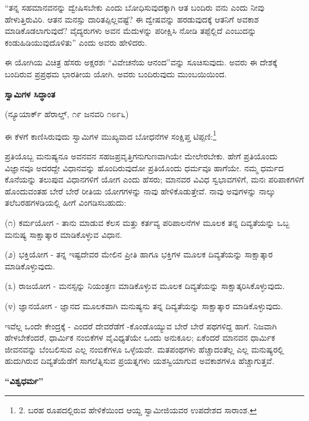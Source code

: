 “ತನ್ನ ಸಹಮಾನವನನ್ನು ದ್ವೇಷಿಸಬೇಕು ಎಂದು ಬೋಧಿಸುವುದಕ್ಕಾಗಿ ಆತ ಬಂದಿರು ವನು ಎಂದು ನೀವು ಹೇಳುತ್ತಿರುವಿರಿ. ಆತನ ಮನಸ್ಸು ದಾರಿತಪ್ಪಿಲ್ಲವಷ್ಟೆ? ಈ ದ್ವೇಷವನ್ನು ಹರಡುವುದಕ್ಕೆ ಆತನಿಗೆ ಅವಕಾಶ ಮಾಡಿಕೊಡಲಾಗುವುದೆ? ವೈದ್ಯರುಗಳು ಅವನ ಮೆದುಳನ್ನು ಪರೀಕ್ಷಿಸಿ ನೋಡಿ ತಪ್ಪೆಲ್ಲಿದೆ ಎಂಬುದನ್ನು ಕಂಡುಹಿಡಿಯುವುದೊಳಿತು” ಎಂದು ಅವರು ಹೇಳಿದರು.

ಈ ಯೋಗಿಯ ವಿಚಿತ್ರ ಹೆಸರು ಅಕ್ಷರಶಃ “ವಿವೇಚನೆಯ ಆನಂದ”ವನ್ನು ಸೂಚಿಸುವುದು. ಅವರು ಈ ದೇಶಕ್ಕೆ ಬಂದಿರುವ ಪ್ರಪ್ರಥಮ ಭಾರತೀಯ ಯೋಗಿ. ಅವರು ಬಂದಿರುವುದು ಮುಂಬಯಿಯಿಂದ.

\begin{center}
\textbf{ಸ್ವಾಮಿಗಳ ಸಿದ್ಧಾಂತ}
\end{center}

\begin{center}
(ನ್ಯೂಯಾರ್ಕ್ ಹೆರಾಲ್ಡ್, ೧೯ ಜನವರಿ ೧೮೯೬)
\end{center}

ಈ ಕೆಳಗೆ ಕಾಣಿಸಿರುವುದು ಸ್ವಾಮಿಗಳ ಮುಖ್ಯವಾದ ಬೋಧನೆಗಳ ಸಂಕ್ಷಿಪ್ತ ಟಿಪ್ಪಣಿ:\footnote{2. ಬರಹ ರೂಪದಲ್ಲಿರುವ ಹೇಳಿಕೆಯಿಂದ ಆಯ್ದ ಸ್ವಾಮೀಜಿಯವರ ಉಪದೇಶದ ಸಾರಾಂಶ.}

ಪ್ರತಿಯೊಬ್ಬ ಮನುಷ್ಯನೂ ಅವನವನ ಸಹಜಪ್ರವೃತ್ತಿಗನುಗುಣವಾಗಿಯೇ ಮೇಲೇರಬೇಕು. ಹೇಗೆ ಪ್ರತಿಯೊಂದು ವಿಜ್ಞಾನವೂ ಅದರದ್ದೇ ವಿಧಾನವನ್ನು ಹೊಂದಿರುವುದೋ ಪ್ರತಿಯೊಂದು ಧರ್ಮವೂ ಹಾಗೆಯೇ. ನಮ್ಮ ಧರ್ಮದ ಕೊನೆಯನ್ನು ತಲುಪುವ ವಿಧಾನಗಳಿಗೆ ಯೋಗ ಎಂದು ಹೆಸರು; ಮಾನವರ ವಿವಿಧ ಸ್ವಭಾವಗಳಿಗೆ, ಮನಃ ಪರಿಪಾಕಗಳಿಗೆ ಹೊಂದುವಂತಹ ಬೇರೆ ಬೇರೆ ರೀತಿಯ ಯೋಗಗಳನ್ನು ನಾವು ಹೇಳಿಕೊಡುತ್ತೇವೆ. ನಾವು ಅವುಗಳನ್ನು ನಾಲ್ಕು ತಲೆಬರಹಗಳಡಿಯಲ್ಲಿ ಹೀಗೆ ವಿಂಗಡಿಸಬಹುದು:

(೧) ಕರ್ಮಯೋಗ - ತಾನು ಮಾಡುವ ಕೆಲಸ ಮತ್ತು ಕರ್ತವ್ಯ ಪರಿಪಾಲನೆಗಳ ಮೂಲಕ ತನ್ನ ದಿವ್ಯತೆಯನ್ನು ಒಬ್ಬ ಮನುಷ್ಯ ಸಾಕ್ಷಾತ್ಕಾರ ಮಾಡಿಕೊಳ್ಳುವ ವಿಧಾನ.

(೨) ಭಕ್ತಿಯೋಗ - ತನ್ನ ಇಷ್ಟದೇವರ ಮೇಲಿನ ಪ್ರೀತಿ ಹಾಗೂ ಭಕ್ತಿಗಳ ಮೂಲಕ ದಿವ್ಯತೆಯನ್ನು ಸಾಕ್ಷಾತ್ಕಾರ ಮಾಡಿಕೊಳ್ಳುವುದು.

(೩) ರಾಜಯೋಗ - ಮನಸ್ಸನ್ನು ನಿಯಂತ್ರಣ ಮಾಡಿಕೊಳ್ಳುವ ಮೂಲಕ ದಿವ್ಯತೆಯನ್ನು ಸಾಕ್ಷಾತ್ಕರಿಸಿಕೊಳ್ಳುವುದು.

(೪) ಜ್ಞಾನಯೋಗ - ಜ್ಞಾನದ ಮೂಲಕವಾಗಿ ಮನುಷ್ಯನು ತನ್ನ ದಿವ್ಯತೆಯನ್ನು ಸಾಕ್ಷಾತ್ಕಾರ ಮಾಡಿಕೊಳ್ಳುವುದು.

ಇವೆಲ್ಲ ಒಂದೇ ಕೇಂದ್ರಕ್ಕೆ - ಎಂದರೆ ದೇವರೆಡೆಗೆ -ಕೊಂಡೊಯ್ಯುವ ಬೇರೆ ಬೇರೆ ಪಥಗಳಿದ್ದ ಹಾಗೆ. ನಿಜವಾಗಿ ಹೇಳಬೇಕೆಂದರೆ, ಧಾರ್ಮಿಕ ನಂಬಿಕೆಗಳ ವೈವಿಧ್ಯತೆಯೇ ಒಂದು ಅನುಕೂಲ; ಏಕೆಂದರೆ ಮಾನವನ ಧಾರ್ಮಿಕ ಜೀವನವನ್ನು ಬೆಂಬಲಿಸುವ ಎಲ್ಲ ನಂಬಿಕೆಗಳೂ ಒಳ್ಳೆಯವೇ. ಮತಪಂಥಗಳು ಹೆಚ್ಚಾದಂತೆಲ್ಲ ಎಲ್ಲ ಮನುಷ್ಯರಲ್ಲಿ ಹುದುಗಿರುವ ದಿವ್ಯತೆಯೆಡೆಗೆ ಸಾಗಲೆತ್ನಿಸುವ ಪ್ರಯತ್ನಗಳು ಯಶಸ್ವಿಯಾಗುವ ಅವಕಾಶಗಳೂ ಹೆಚ್ಚಾಗುತ್ತವೆ.

\begin{center}
\textbf{“ವಿಶ್ವಧರ್ಮ”}
\end{center}

